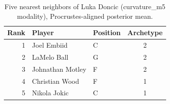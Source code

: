 \begin{table}[htbp]
  \centering\small
  \begin{tabular}{rllc}
    \toprule
    Rank & Player & Position & Archetype \\
    \midrule
    1 & Joel Embiid & C & 2 \\
    2 & LaMelo Ball & G & 2 \\
    3 & Johnathan Motley & F & 2 \\
    4 & Christian Wood & F & 1 \\
    5 & Nikola Jokic & C & 1 \\
    \bottomrule
  \end{tabular}
  \caption{Five nearest neighbors of Luka Doncic (curvature_m5 modality), Procrustes-aligned posterior mean.}
  \label{tab:Luka_Doncic_neighbors_curvature_m5}
\end{table}

